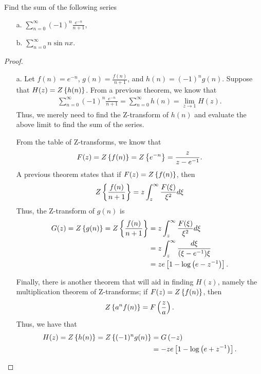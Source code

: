 \begin{problem}{8}
  Find the sum of the following series
  \begin{enumerate}
    \item[a.] $\displaystyle \sum_{n=0}^\infty (-1)^n \frac{e^{-n}}{n+1}$,
    \item[b.] $\displaystyle \sum_{n=0}^\infty n \sin nx$.
  \end{enumerate}
\end{problem}

\begin{proof}
  \begin{enumerate}
    \item[a.] Let $f(n) = e^{-n}$, $\displaystyle g(n) = \frac{f(n)}{n+1}$, and $h(n) = (-1)^n g(n)$.
      Suppose that $H(z) = Z\left\{ {h(n)} \right\}$. From a previous theorem, we know that
      \begin{align}
        \label{sum}
        \sum_{n=0}^\infty (-1)^n \frac{e^{-n}}{n+1} = \sum_{n=0}^\infty h(n) = \lim_{z\to 1} H(z).
      \end{align}
      Thus, we merely need to find the Z-transform of $h(n)$ and evaluate the above limit to find the sum
      of the series.

      From the table of Z-transforms, we know that
      \begin{align*}
        F(z) = Z\left\{ {f(n)} \right\} = Z\left\{ {e^{-n}} \right\} = \frac{z}{z-e^{-1}}.
      \end{align*}
      A previous theorem states that if $F(z) = Z\left\{ {f(n)} \right\}$, then
      \begin{align*}
        Z\left\{ {\frac{f(n)}{n+1}} \right\} = z \int_z^\infty \frac{F(\xi)}{\xi^2} d\xi
      \end{align*}
      Thus, the Z-transform of $g(n)$ is
      \begin{align*}
        G(z) = Z\left\{ {g(n)} \right\} = Z\left\{ {\frac{f(n)}{n+1}} \right\} &= z\int_z^\infty\frac{F(\xi)}{\xi^2} d\xi \\
        &= z \int_z^\infty \frac{d\xi}{(\xi - e^{-1})\xi} \\
        &= z e\left[1 - \log \left(e - z^{-1}\right)\right].
      \end{align*}

      Finally, there is another theorem that will aid in finding $H(z)$, namely the multiplication theorem
      of Z-transforms; if $F(z) = Z\left\{ {f(n)} \right\}$, then
      \begin{align*}
        Z\left\{ {a^n f(n)} \right\} = F\left(\frac{z}{a}\right).
      \end{align*}
      Thus, we have that
      \begin{align*}
        H(z) = Z\left\{ {h(n)} \right\} = Z\left\{ {(-1)^n g(n)} \right\} &=  G\left(-z\right) \\
        &= -z e\left[1 - \log \left(e + z^{-1}\right)\right].
      \end{align*}


\end{enumerate}
\end{proof}
